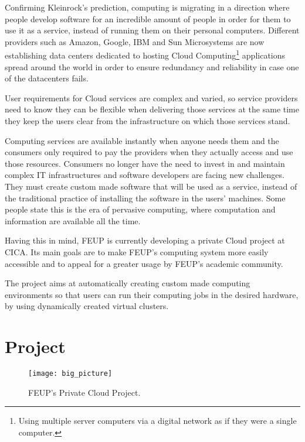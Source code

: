 Confirming Kleinrock's prediction, computing is migrating in a direction where people develop software for an incredible amount of people in order for them to use it as a service, instead of running them on their personal computers. Different providers such as Amazon, Google, IBM and Sun Microsystems are now establishing data centers dedicated to hosting Cloud Computing\footnote{Using multiple server computers via a digital network as if they were a single computer.} applications spread around the world in order to ensure redundancy and reliability in case one of the datacenters fails. 

User requirements for Cloud services are complex and varied, so service providers need to know they can be flexible when delivering those services at the same time they keep the users clear from the infrastructure on which those services stand.

Computing services are available instantly when anyone needs them and the consumers only required to pay the providers when they actually access and use those resources. Consumers no longer have the need to invest in and maintain complex IT infrastructures and software developers are facing new challenges. They must create custom made software that will be used as a service, instead of the traditional practice of installing the software in the users' machines. Some people state this is the era of pervasive computing, where computation and information are available all the time.~\citet{ieees}

Having this in mind, FEUP is currently developing a private Cloud project at CICA. Its main goals are to make FEUP's computing system more easily accessible and to appeal for a greater usage by FEUP's academic community.

The project aims at automatically creating custom made computing environments so that users can run their computing jobs in the desired hardware, by using dynamically created virtual clusters.
	

\section{Project} \label{sec:proj}
	
\begin{figure}[t]
  \begin{center}
    \leavevmode
    \texttt{[image: big\_picture]}
    \caption{FEUP's Private Cloud Project.}
    \label{fig:big_picture}
  \end{center}
\end{figure}
	
